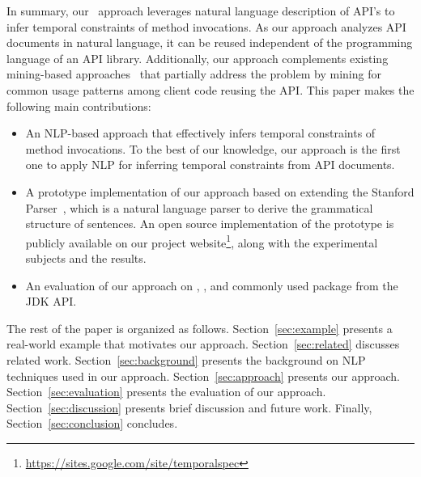 In summary, our \tool\ approach leverages natural language description of API's to infer temporal constraints of method invocations.
As our approach analyzes API documents in natural language, it can be reused independent of the programming language of an API library.
Additionally, our approach complements existing mining-based approaches~\cite{buse2012synthesizing, thummalapenta07parseweb, Wang:2013:MSR, Zhong:2009:MMR} that partially address the problem by mining for common usage patterns among client code reusing the API.
This paper makes the following main contributions:

\begin{itemize}
	\item An NLP-based approach that effectively infers temporal constraints of method invocations. 
	To the best of our knowledge, our approach is the first one to apply NLP for inferring temporal constraints from API documents.
	\item A prototype implementation of our approach based on extending the Stanford Parser~\cite{Klein03}, which is a natural language parser to derive the grammatical structure of sentences.
	An open source implementation of the prototype is publicly available on our project website\footnote{\url{https://sites.google.com/site/temporalspec}}, along with the experimental subjects and the results. 
	\item An evaluation of our approach on \amazonAPI, \paypalAPI, and commonly used package  from the JDK API. 
\end{itemize}


The rest of the paper is organized as follows.
Section~\ref{sec:example} presents a real-world example that motivates our approach.
Section~\ref{sec:related} discusses related work.
Section~\ref{sec:background} presents the  background on NLP techniques used in our approach.
Section~\ref{sec:approach} presents our approach.
Section~\ref{sec:evaluation} presents the evaluation of our approach.
Section~\ref{sec:discussion} presents brief discussion and future work.
Finally, Section~\ref{sec:conclusion} concludes.


